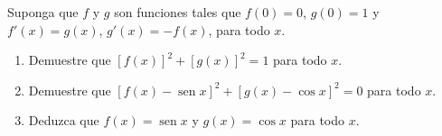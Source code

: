 \item Suponga que $f$ y $g$ son funciones tales que $f(0) = 0$, $g(0) = 1$ y $f'(x) = g(x)$, $g'(x) = -f(x)$, para todo $x$.
\begin{enumerate}
    \item[(a)] Demuestre que $[f(x)]^2 + [g(x)]^2 = 1$ para todo $x$.
    \item[(b)] Demuestre que $[f(x) - \operatorname{sen} x]^2 + [g(x) - \cos x]^2 = 0$ para todo $x$.
    \item[(c)] Deduzca que $f(x) = \operatorname{sen} x$ y $g(x) = \cos x$ para todo $x$.
\end{enumerate}
